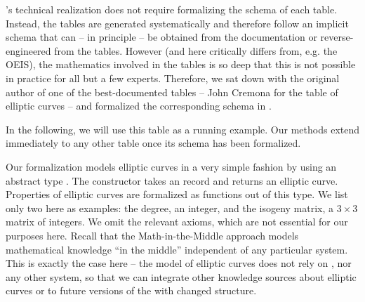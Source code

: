 \lmfdb's technical realization does not require formalizing the schema of each table. 
Instead, the tables are generated systematically and therefore follow an implicit schema that can -- in principle -- be obtained from the documentation or reverse-engineered from the tables. 
However (and here \lmfdb critically differs from, e.g. the OEIS), the mathematics involved in the tables is so deep that this is not possible in practice for all but a few experts. 
Therefore, we sat down with the original author of one of the best-documented tables -- John Cremona for the table of elliptic curves -- and formalized the corresponding schema in \ommt. 

In the following, we will use this table as a running example.
Our methods extend immediately to any other table once its schema has been formalized.

Our formalization models elliptic curves in a very simple fashion by using an abstract type . 
The constructor  takes an \mmt record and returns an elliptic curve. 
Properties of elliptic curves are formalized as functions out of this type.
We list only two here as examples: the \textsf{degree}, an integer, and the \textsf{isogeny matrix}, a $3 \times 3$ matrix of integers.
We omit the relevant axioms, which are not essential for our purposes here.
Recall that the Math-in-the-Middle approach models mathematical knowledge ``in the middle'' independent of any particular system.
This is exactly the case here -- the model of elliptic curves does not rely on \lmfdb, nor any other system, so that we can integrate other knowledge sources about elliptic curves or to future versions of the \lmfdb with changed structure. 



